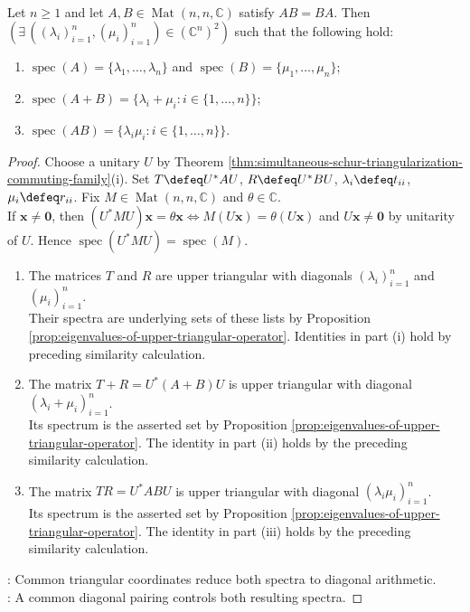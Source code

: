 \begin{corollary} \label{cor:commuting-sum-product-eigenvalues} \\
Let $n\geq1$ and let $A,B\in\operatorname{Mat}(n,n,\mathbb{C})$ satisfy $AB=BA$. Then $(\exists\,((\lambda_i)_{i=1}^{n},(\mu_i)_{i=1}^{n})\in(\mathbb{C}^n)^2)$ such that the following hold:
\begin{enumerate}[label=(\roman*)]
\setlength{\itemsep}{0pt}
\item $\operatorname{spec}(A)=\{\lambda_1,\ldots,\lambda_n\}$ and $\operatorname{spec}(B)=\{\mu_1,\ldots,\mu_n\}$;
\item $\operatorname{spec}(A+B)=\{\lambda_i+\mu_i:i\in\{1,\ldots,n\}\}$;
\item $\operatorname{spec}(AB)=\{\lambda_i\mu_i:i\in\{1,\ldots,n\}\}$.
\end{enumerate}
\begin{proof}
Choose a unitary $U$ by Theorem \ref{thm:simultaneous-schur-triangularization-commuting-family}(i). Set $T\defeq U^*AU$, $R\defeq U^*BU$, $\lambda_i\defeq t_{ii}$, $\mu_i\defeq r_{ii}$. Fix $M\in\operatorname{Mat}(n,n,\mathbb{C})$ and $\theta\in\mathbb{C}$.\\
If $\mathbf{x}\neq\mathbf{0}$, then $(U^*MU)\mathbf{x}=\theta\mathbf{x}\Longleftrightarrow M(U\mathbf{x})=\theta(U\mathbf{x})$ and $U\mathbf{x}\neq\mathbf{0}$ by unitarity of $U$. Hence $\operatorname{spec}(U^*MU)=\operatorname{spec}(M)$.
\begin{enumerate}[label=(\roman*)]
\setlength{\itemsep}{0pt}
\item The matrices $T$ and $R$ are upper triangular with diagonals $(\lambda_i)_{i=1}^{n}$ and $(\mu_i)_{i=1}^{n}$.\\
Their spectra are underlying sets of these lists by Proposition \ref{prop:eigenvalues-of-upper-triangular-operator}. Identities in part (i) hold by preceding similarity calculation.
\item The matrix $T+R=U^*(A+B)U$ is upper triangular with diagonal $(\lambda_i+\mu_i)_{i=1}^{n}$.\\
Its spectrum is the asserted set by Proposition \ref{prop:eigenvalues-of-upper-triangular-operator}. The identity in part (ii) holds by the preceding similarity calculation.
\item The matrix $TR=U^*ABU$ is upper triangular with diagonal $(\lambda_i\mu_i)_{i=1}^{n}$.\\
Its spectrum is the asserted set by Proposition \ref{prop:eigenvalues-of-upper-triangular-operator}. The identity in part (iii) holds by the preceding similarity calculation.
\end{enumerate}
: Common triangular coordinates reduce both spectra to diagonal arithmetic.\\
: A common diagonal pairing controls both resulting spectra.
\end{proof}
\end{corollary}
